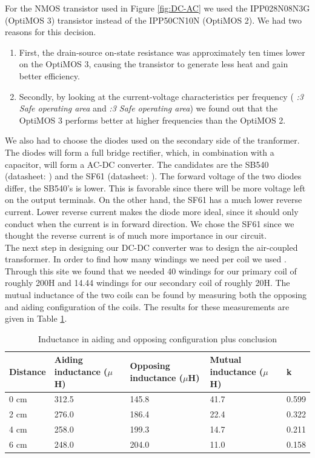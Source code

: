 \documentclass[final]{scrreprt} %
\begin{document}
For the NMOS transistor used in Figure \ref{fig:DC-AC} we used the IPP028N08N3G (OptiMOS 3) transistor instead of the IPP50CN10N (OptiMOS 2).
We had two reasons for this decision.
\begin{enumerate}
\item First, the drain-source on-state resistance was approximately ten times lower on the OptiMOS 3, causing the transistor to generate less heat and gain better efficiency.
\item Secondly, by looking at the current-voltage characteristics per frequency (\cite{OptiMOS2} \emph{:3 Safe operating area} and \cite{OptiMOS3} \emph{:3 Safe operating area}) we found out that the OptiMOS 3 performs better at higher frequencies than the OptiMOS 2.
\end{enumerate}

We also had to choose the diodes used on the secondary side of the tranformer. 
The diodes will form a full bridge rectifier, which, in combination with a capacitor, will form a AC-DC converter.
The candidates are the SB540 (datasheet: \cite{SB540}) and the SF61 (datasheet: \cite{SF61}).
The forward voltage of the two diodes differ, the SB540's is lower. 
This is favorable since there will be more voltage left on the output terminals.
On the other hand, the SF61 has a much lower reverse current. 
Lower reverse current makes the diode more ideal, since it should only conduct when the current is in forward direction.
We chose the SF61 since we thought the reverse current is of much more importance in our circuit.\\



The next step in designing our DC-DC converter was to design the air-coupled transformer. 
In order to find how many windings we need per coil we used \cite{windings}.
Through this site we found that we needed 40 windings for our primary coil of roughly \unit{200}{\micro}H and 14.44 windings for our secondary coil of roughly \unit{20}{\micro}H.
The mutual inductance of the two coils can be found by measuring both the opposing and aiding configuration of the coils. 
The results for these measurements are given in Table \ref{tab:inductances}.

\begin{table} [h]
\begin{center}
	\begin{tabular}{ l | l | l | l | l }
	Distance & Aiding inductance ($\mu$H) & Opposing inductance ($\mu$H) & Mutual inductance ($\mu$H) & k \\ \hline
  	0 cm & 312.5 & 145.8 & 41.7 & 0.599 \\
	2 cm & 276.0 & 186.4 & 22.4 & 0.322 \\
	4 cm & 258.0 & 199.3 & 14.7 & 0.211 \\
	6 cm & 248.0 & 204.0 & 11.0 & 0.158 \\
	\end{tabular}
	\caption{Inductance in aiding and opposing configuration plus conclusion}
	\label{tab:inductances}
\end{center}
\end{table}
\end{document}
